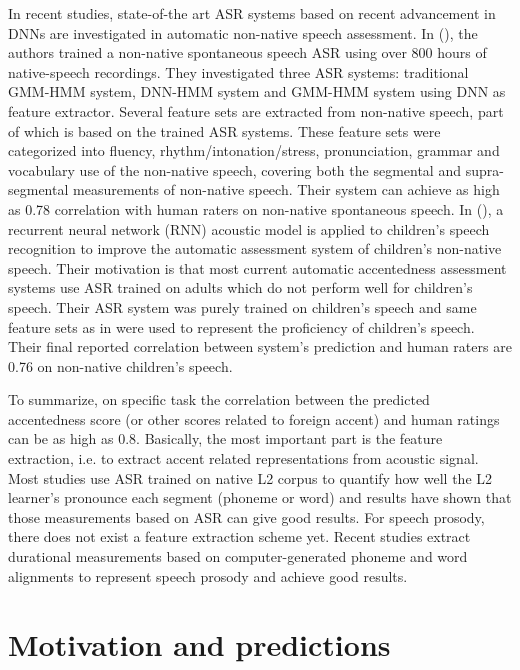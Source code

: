 In recent studies, state-of-the art ASR systems based on recent advancement in DNNs are investigated in automatic non-native speech assessment. In (\cite{tao2016exploring}), the authors trained a non-native spontaneous speech ASR using over 800 hours of native-speech recordings. They investigated three ASR systems: traditional GMM-HMM system, DNN-HMM system and GMM-HMM system using DNN as feature extractor. Several feature sets are extracted from non-native speech, part of which is based on the trained ASR systems. These feature sets were categorized into fluency, rhythm/intonation/stress, pronunciation, grammar and vocabulary use of the non-native speech, covering both the segmental and supra-segmental measurements of non-native speech. Their system can achieve as high as 0.78 correlation with human raters on non-native spontaneous speech. In (\cite{qian2017bidirectional}), a recurrent neural network (RNN) acoustic model is applied to children's speech recognition to improve the automatic assessment system of children's non-native speech. Their motivation is that most current automatic accentedness assessment systems use ASR trained on adults which do not perform well for children's speech. Their ASR system was purely trained on children's speech and same feature sets as in \cite{tao2016exploring} were used to represent the proficiency of children's speech. Their final reported correlation between system's prediction and human raters are 0.76 on non-native children's speech.

To summarize, on specific task the correlation between the predicted accentedness score (or other scores related to foreign accent) and human ratings can be as high as 0.8. Basically, the most important part is the feature extraction, i.e. to extract accent related representations from acoustic signal. Most studies use ASR trained on native L2 corpus to quantify how well the L2 learner's pronounce each segment (phoneme or word) and results have shown that those measurements based on ASR can give good results. For speech prosody, there does not exist a feature extraction scheme yet. Recent studies extract durational measurements based on computer-generated phoneme and word alignments to represent speech prosody and achieve good results.

\section{Motivation and predictions}

